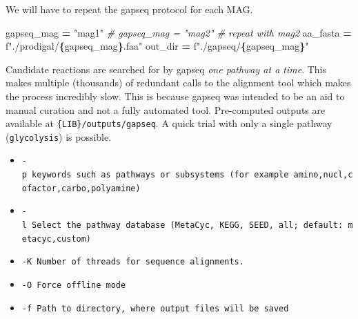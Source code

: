 \documentclass[
]{book}
\newenvironment{Shaded}{\begin{snugshade}}{\end{snugshade}}
\newcommand{\CommentTok}[1]{\textcolor[rgb]{0.56,0.35,0.01}{\textit{#1}}}
\newcommand{\NormalTok}[1]{#1}
\newcommand{\OperatorTok}[1]{\textcolor[rgb]{0.81,0.36,0.00}{\textbf{#1}}}
\newcommand{\SpecialCharTok}[1]{\textcolor[rgb]{0.81,0.36,0.00}{\textbf{#1}}}
\newcommand{\SpecialStringTok}[1]{\textcolor[rgb]{0.31,0.60,0.02}{#1}}
\newcommand{\StringTok}[1]{\textcolor[rgb]{0.31,0.60,0.02}{#1}}
\providecommand{\tightlist}{%
  \setlength{\itemsep}{0pt}\setlength{\parskip}{0pt}}
\begin{document}
We will have to repeat the gapseq protocol for each MAG.

\begin{Shaded}
\begin{Highlighting}[numbers=left,,]
\NormalTok{gapseq\_mag }\OperatorTok{=} \StringTok{"mag1"}
\CommentTok{\# gapseq\_mag = "mag2" \# repeat with mag2}
\NormalTok{aa\_fasta }\OperatorTok{=} \SpecialStringTok{f"./prodigal/}\SpecialCharTok{\{}\NormalTok{gapseq\_mag}\SpecialCharTok{\}}\SpecialStringTok{.faa"}
\NormalTok{out\_dir }\OperatorTok{=} \SpecialStringTok{f"./gapseq/}\SpecialCharTok{\{}\NormalTok{gapseq\_mag}\SpecialCharTok{\}}\SpecialStringTok{"}
\end{Highlighting}
\end{Shaded}

Candidate reactions are searched for by gapseq \emph{one pathway at a time}. This makes multiple (thousands)
of redundant calls to the alignment tool which makes the process incredibly slow. This is because gapseq
was intended to be an aid to manual curation and not a fully automated tool.
Pre-computed outputs are available at \texttt{\{LIB\}/outputs/gapseq}. A quick trial with only a single pathway
(\texttt{glycolysis}) is possible.

\begin{itemize}
\tightlist
\item
  \texttt{-p\ keywords\ such\ as\ pathways\ or\ subsystems\ (for\ example\ amino,nucl,cofactor,carbo,polyamine)}
\item
  \texttt{-l\ Select\ the\ pathway\ database\ (MetaCyc,\ KEGG,\ SEED,\ all;\ default:\ metacyc,custom)}
\item
  \texttt{-K\ Number\ of\ threads\ for\ sequence\ alignments.}
\item
  \texttt{-O\ Force\ offline\ mode}
\item
  \texttt{-f\ Path\ to\ directory,\ where\ output\ files\ will\ be\ saved}
\end{itemize}
\end{document}
